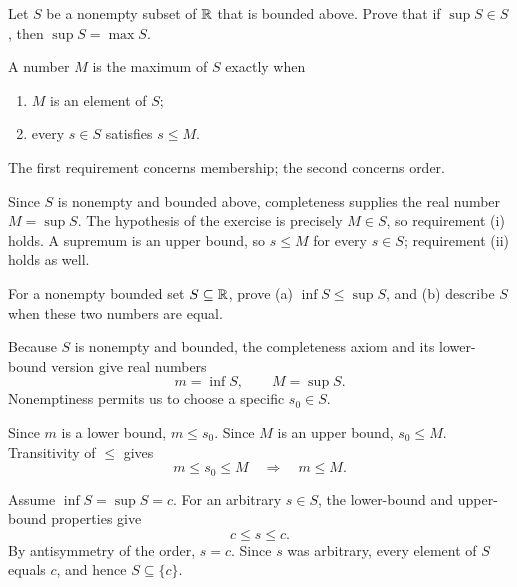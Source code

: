 
\goal Let $S$ be a nonempty subset of $\mathbb{R}$ that is bounded above. Prove
that if $\sup S\in S$, then $\sup S=\max S$.

A number $M$ is the maximum of $S$ exactly when
\begin{enumerate}[label=(\roman*)]
 \item $M$ is an element of $S$;
 \item every $s\in S$ satisfies $s\le M$.
\end{enumerate}
The first requirement concerns membership; the second concerns order.

Since $S$ is nonempty and bounded above, completeness supplies the real
number $M=\sup S$. The hypothesis of the exercise is precisely $M\in S$,
so requirement (i) holds. A supremum is an upper bound, so $s\le M$
for every $s\in S$; requirement (ii) holds as well.



\goal For a nonempty bounded set $S\subseteq\mathbb{R}$, prove (a)
$\inf S\le\sup S$, and (b) describe $S$ when these two numbers are equal.

Because $S$ is nonempty and bounded, the completeness axiom and its
lower-bound version give real numbers
\[
 m=\inf S,\qquad M=\sup S.
\]
Nonemptiness permits us to choose a specific $s_0\in S$.

Since $m$ is a lower bound, $m\le s_0$. Since $M$ is an upper bound,
$s_0\le M$. Transitivity of $\le$ gives
\[
 m\le s_0\le M\quad\Longrightarrow\quad m\le M.
\]


Assume $\inf S=\sup S=c$. For an arbitrary $s\in S$, the lower-bound
and upper-bound properties give
\[
 c\le s\le c.
\]
By antisymmetry of the order, $s=c$. Since $s$ was arbitrary, every
element of $S$ equals $c$, and hence $S\subseteq\{c\}$.

